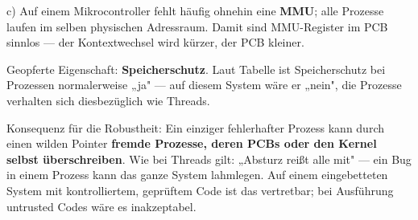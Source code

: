 \documentclass[11pt, a4paper]{article}
\begin{document}
c) Auf einem Mikrocontroller fehlt häufig ohnehin eine \textbf{MMU}; alle Prozesse laufen im selben physischen Adressraum. Damit sind MMU-Register im PCB sinnlos — der Kontextwechsel wird kürzer, der PCB kleiner.


Geopferte Eigenschaft: \textbf{Speicherschutz}. Laut Tabelle ist Speicherschutz bei Prozessen normalerweise „ja" — auf diesem System wäre er „nein", die Prozesse verhalten sich diesbezüglich wie Threads.


Konsequenz für die Robustheit: Ein einziger fehlerhafter Prozess kann durch einen wilden Pointer \textbf{fremde Prozesse, deren PCBs oder den Kernel selbst überschreiben}. Wie bei Threads gilt: „Absturz reißt alle mit" — ein Bug in einem Prozess kann das ganze System lahmlegen. Auf einem eingebetteten System mit kontrolliertem, geprüftem Code ist das vertretbar; bei Ausführung untrusted Codes wäre es inakzeptabel.





\end{document}
